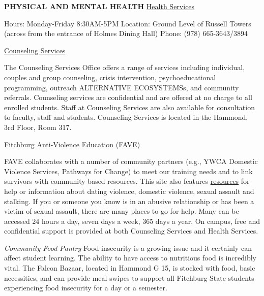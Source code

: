 \documentclass[]{tufte-handout}
\begin{document}
\textbf{PHYSICAL AND MENTAL HEALTH}
\href{http://www.google.com/url?q=http\%3A\%2F\%2Fwww.fitchburgstate.edu\%2Foffices-services-directory\%2Fhealth-services\%2F\&sa=D\&sntz=1\&usg=AFQjCNEw5V0i0hL5DVO5b43gejNNaAt4ig}{Health
Services}

Hours: Monday-Friday 8:30AM-5PM Location: Ground Level of Russell Towers
(across from the entrance of Holmes Dining Hall) Phone: (978)
665-3643/3894

\href{http://www.google.com/url?q=http\%3A\%2F\%2Fwww.fitchburgstate.edu\%2Foffices-services-directory\%2Fcounseling-services\%2F\&sa=D\&sntz=1\&usg=AFQjCNEYiS4EmSvWerpp2bKr5lTpouPuqQ}{Counseling
Services}

The Counseling Services Office offers a range of services including
individual, couples and group counseling, crisis intervention,
psychoeducational programming, outreach ALTERNATIVE ECOSYSTEMSs, and
community referrals. Counseling services are confidential and are
offered at no charge to all enrolled students. Staff at Counseling
Services are also available for consultation to faculty, staff and
students. Counseling Services is located in the Hammond, 3rd Floor, Room
317.

\href{http://www.google.com/url?q=http\%3A\%2F\%2Fwww.fitchburgstate.edu\%2Foffices-services-directory\%2Ffitchburg-anti-violence-education\%2F\&sa=D\&sntz=1\&usg=AFQjCNFi5qy-wunMxX-hoWbA9YwT8aa4Ig}{Fitchburg
Anti-Violence Education (FAVE)}

FAVE collaborates with a number of community partners (e.g., YWCA
Domestic Violence Services, Pathways for Change) to meet our training
needs and to link survivors with community based resources. This site
also features
\href{http://www.google.com/url?q=http\%3A\%2F\%2Fwww.fitchburgstate.edu\%2Foffices-services-directory\%2Ffitchburg-anti-violence-education\%2Ffitchburg-anti-violence-education-resources\%2F\&sa=D\&sntz=1\&usg=AFQjCNF9KZ2O1AvPMLJTHdNg1DfmYYtgog}{resources}
for help or information about dating violence, domestic violence, sexual
assault and stalking. If you or someone you know is in an abusive
relationship or has been a victim of sexual assault, there are many
places to go for help. Many can be accessed 24 hours a day, seven days a
week, 365 days a year. On campus, free and confidential support is
provided at both Counseling Services and Health Services.

\emph{Community Food Pantry} Food insecurity is a growing issue and it
certainly can affect student learning. The ability to have access to
nutritious food is incredibly vital. The Falcon Bazaar, located in
Hammond G 15, is stocked with food, basic necessities, and can provide
meal swipes to support all Fitchburg State students experiencing food
insecurity for a day or a semester.
\end{document}
